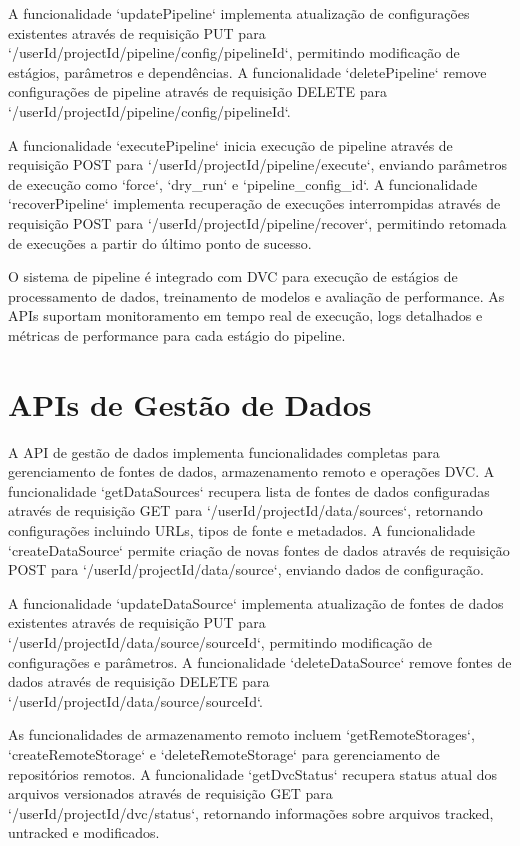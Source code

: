 \documentclass[12pt,a4paper]{article}
\begin{document}
A funcionalidade `updatePipeline` implementa atualização de configurações existentes através de requisição PUT para `/{userId}/{projectId}/pipeline/config/{pipelineId}`, permitindo modificação de estágios, parâmetros e dependências. A funcionalidade `deletePipeline` remove configurações de pipeline através de requisição DELETE para `/{userId}/{projectId}/pipeline/config/{pipelineId}`.

A funcionalidade `executePipeline` inicia execução de pipeline através de requisição POST para `/{userId}/{projectId}/pipeline/execute`, enviando parâmetros de execução como `force`, `dry_run` e `pipeline_config_id`. A funcionalidade `recoverPipeline` implementa recuperação de execuções interrompidas através de requisição POST para `/{userId}/{projectId}/pipeline/recover`, permitindo retomada de execuções a partir do último ponto de sucesso.

O sistema de pipeline é integrado com DVC para execução de estágios de processamento de dados, treinamento de modelos e avaliação de performance. As APIs suportam monitoramento em tempo real de execução, logs detalhados e métricas de performance para cada estágio do pipeline.

\section{APIs de Gestão de Dados}

A API de gestão de dados implementa funcionalidades completas para gerenciamento de fontes de dados, armazenamento remoto e operações DVC. A funcionalidade `getDataSources` recupera lista de fontes de dados configuradas através de requisição GET para `/{userId}/{projectId}/data/sources`, retornando configurações incluindo URLs, tipos de fonte e metadados. A funcionalidade `createDataSource` permite criação de novas fontes de dados através de requisição POST para `/{userId}/{projectId}/data/source`, enviando dados de configuração.

A funcionalidade `updateDataSource` implementa atualização de fontes de dados existentes através de requisição PUT para `/{userId}/{projectId}/data/source/{sourceId}`, permitindo modificação de configurações e parâmetros. A funcionalidade `deleteDataSource` remove fontes de dados através de requisição DELETE para `/{userId}/{projectId}/data/source/{sourceId}`.

As funcionalidades de armazenamento remoto incluem `getRemoteStorages`, `createRemoteStorage` e `deleteRemoteStorage` para gerenciamento de repositórios remotos. A funcionalidade `getDvcStatus` recupera status atual dos arquivos versionados através de requisição GET para `/{userId}/{projectId}/dvc/status`, retornando informações sobre arquivos tracked, untracked e modificados.
\end{document}
